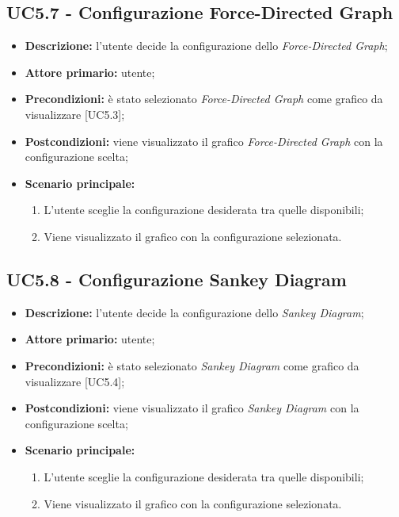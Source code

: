 \subsection{UC5.7 - Configurazione Force-Directed Graph}
\begin{itemize}
    \item \textbf{Descrizione:} l'utente decide la configurazione dello \textit{Force-Directed Graph};
    \item \textbf{Attore primario:} utente;
    \item \textbf{Precondizioni:} è stato selezionato \textit{Force-Directed Graph} come grafico da visualizzare [UC5.3];
    \item \textbf{Postcondizioni:} viene visualizzato il grafico \textit{Force-Directed Graph} con la configurazione scelta;
    \item \textbf{Scenario principale:}
    \begin{enumerate}
      \item L'utente sceglie la configurazione desiderata tra quelle disponibili;
      \item Viene visualizzato il grafico con la configurazione selezionata.
    \end{enumerate}
\end{itemize}

\subsection{UC5.8 - Configurazione Sankey Diagram}
\begin{itemize}
    \item \textbf{Descrizione:} l'utente decide la configurazione dello \textit{Sankey Diagram};
    \item \textbf{Attore primario:} utente;
    \item \textbf{Precondizioni:} è stato selezionato \textit{Sankey Diagram} come grafico da visualizzare [UC5.4];
    \item \textbf{Postcondizioni:} viene visualizzato il grafico \textit{Sankey Diagram} con la configurazione scelta;
    \item \textbf{Scenario principale:}
    \begin{enumerate}
      \item L'utente sceglie la configurazione desiderata tra quelle disponibili;
      \item Viene visualizzato il grafico con la configurazione selezionata.
    \end{enumerate}
\end{itemize}

